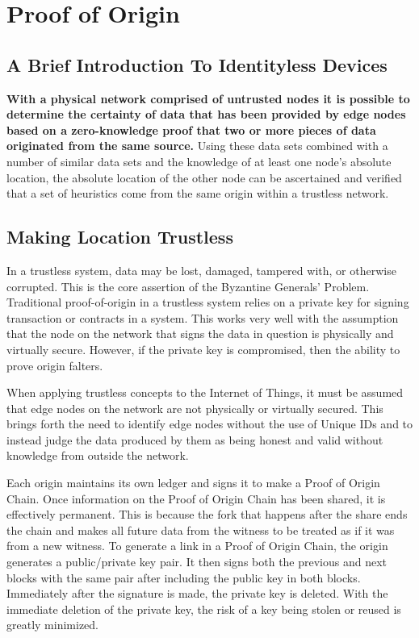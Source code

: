 \documentclass{article}
\begin{document}
\section {Proof of Origin}


\subsection {A Brief Introduction To Identityless Devices}
\textbf{With a physical network comprised of untrusted nodes it is possible to determine the \gls{certainty} of data that has been provided by edge nodes based on a zero-knowledge proof that two or more pieces of data originated from the same source.} Using these data sets combined with a number of similar data sets and the knowledge of at least one node's absolute location, the absolute location of the other node can be ascertained and verified that a set of \glspl{heuristic} come from the same origin within a trustless network.

\subsection {Making Location Trustless}
In a trustless system, data may be lost, damaged, tampered with, or otherwise corrupted. This is the core assertion of the Byzantine Generals' Problem. Traditional \Gls{proof-of-origin} in a trustless system relies on a private key for signing transaction or contracts in a system. This works very well with the assumption that the node on the network that signs the data in question is physically and virtually secure. However, if the private key is compromised, then the ability to prove origin falters.

When applying trustless concepts to the Internet of Things, it must be assumed that edge nodes on the network are not physically or virtually secured. This brings forth the need to identify edge nodes without the use of Unique IDs and to instead judge the data produced by them as being honest and valid without knowledge from outside the network.

Each origin maintains its own ledger and signs it to make a Proof of Origin Chain. Once information on the Proof of Origin Chain has been shared, it is effectively permanent. This is because the fork that happens after the share ends the chain and makes all future data from the witness to be treated as if it was from a new witness. To generate a link in a Proof of Origin Chain, the origin generates a public/private key pair. It then signs both the previous and next blocks with the same pair after including the public key in both blocks. Immediately after the signature is made, the private key is deleted. With the immediate deletion of the private key, the risk of a key being stolen or reused is greatly minimized.
\end{document}

